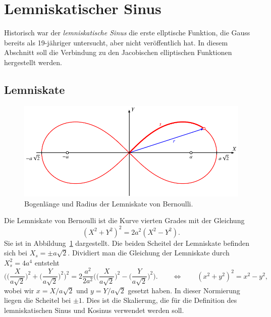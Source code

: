 %
%
%
\section{Lemniskatischer Sinus
\label{buch:elliptisch:section:lemniskate}}
Historisch war der {\em lemniskatische Sinus} die erste ellptische
Funktion, die Gauss bereits als 19-jähriger untersucht, aber nicht 
veröffentlich hat.
In diesem Abschnitt soll die Verbindung zu den Jacobischen
elliptischen Funktionen hergestellt werden.

\subsection{Lemniskate
\label{buch:gemotrie:subsection:lemniskate}}
\begin{figure}
\centering
\includegraphics{chapters/110-elliptisch/images/lemniskate.pdf}
\caption{Bogenlänge und Radius der Lemniskate von Bernoulli.
\label{buch:elliptisch:fig:lemniskate}}
\end{figure}
Die Lemniskate von Bernoulli ist die Kurve vierten Grades mit der Gleichung
\begin{equation}
(X^2+Y^2)^2 = 2a^2(X^2-Y^2).
\label{buch:elliptisch:eqn:lemniskate}
\end{equation}
Sie ist in Abbildung~\ref{buch:elliptisch:fig:lemniskate}
dargestellt.
Die beiden Scheitel der Lemniskate befinden sich bei $X_s=\pm a\sqrt{2}$.
Dividiert man die Gleichung der Lemniskate durch $X_s^2=4a^4$ entsteht 
\begin{equation}
\biggl(
\biggl(\frac{X}{a\sqrt{2}}\biggr)^2
+
\biggl(\frac{Y}{a\sqrt{2}}\biggr)^2
\biggr)^2
=
2\frac{a^2}{2a^2}\biggl(
\biggl(\frac{X}{a\sqrt{2}}\biggr)^2
-
\biggl(\frac{Y}{a\sqrt{2}}\biggr)^2
\biggr).
\qquad
\Leftrightarrow
\qquad
(x^2+y^2)^2 = x^2-y^2,
\label{buch:elliptisch:eqn:lemniskatenormiert}
\end{equation}
wobei wir $x=X/a\sqrt{2}$ und $y=Y/a\sqrt{2}$ gesetzt haben.
In dieser Normierung liegen die Scheitel bei $\pm 1$.
Dies ist die Skalierung, die für die Definition des lemniskatischen
Sinus und Kosinus verwendet werden soll.

